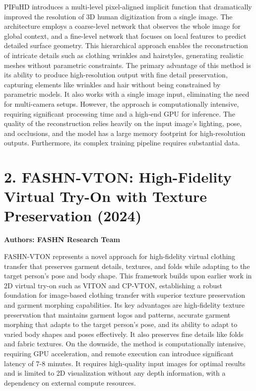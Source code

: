 \documentclass[12pt,a4paper,oneside]{report}
\begin{document}
PIFuHD introduces a multi-level pixel-aligned implicit function that dramatically improved the resolution of 3D human digitization from a single image. The architecture employs a coarse-level network that observes the whole image for global context, and a fine-level network that focuses on local features to predict detailed surface geometry. This hierarchical approach enables the reconstruction of intricate details such as clothing wrinkles and hairstyles, generating realistic meshes without parametric constraints. The primary advantage of this method is its ability to produce high-resolution output with fine detail preservation, capturing elements like wrinkles and hair without being constrained by parametric models. It also works with a single image input, eliminating the need for multi-camera setups. However, the approach is computationally intensive, requiring significant processing time and a high-end GPU for inference. The quality of the reconstruction relies heavily on the input image's lighting, pose, and occlusions, and the model has a large memory footprint for high-resolution outputs. Furthermore, its complex training pipeline requires substantial data.

\section*{2. FASHN-VTON: High-Fidelity Virtual Try-On with Texture Preservation (2024)}

\textbf{Authors: FASHN Research Team}

FASHN-VTON represents a novel approach for high-fidelity virtual clothing transfer that preserves garment details, textures, and folds while adapting to the target person's pose and body shape. This framework builds upon earlier work in 2D virtual try-on such as VITON and CP-VTON, establishing a robust foundation for image-based clothing transfer with superior texture preservation and garment morphing capabilities. Its key advantages are high-fidelity texture preservation that maintains garment logos and patterns, accurate garment morphing that adapts to the target person's pose, and its ability to adapt to varied body shapes and poses effectively. It also preserves fine details like folds and fabric textures. On the downside, the method is computationally intensive, requiring GPU acceleration, and remote execution can introduce significant latency of 7-8 minutes. It requires high-quality input images for optimal results and is limited to 2D visualization without any depth information, with a dependency on external compute resources.
\end{document}
